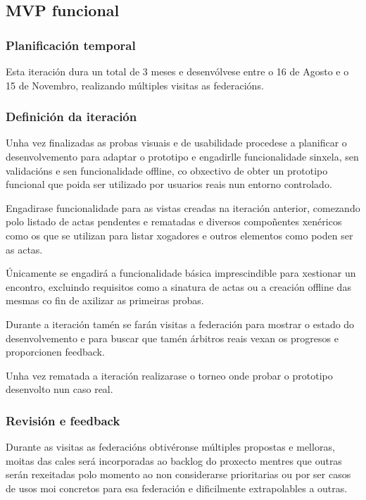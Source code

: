     \subsection{MVP funcional}

      \subsubsection{Planificación temporal}
      Esta iteración dura un total de 3 meses e desenvólvese entre o 16 de 
Agosto e o 15 de Novembro, realizando múltiples visitas as federacións.

      \subsubsection{Definición da iteración}
      Unha vez finalizadas as probas visuais e de usabilidade procedese 
a planificar o desenvolvemento para adaptar o prototipo e engadirlle 
funcionalidade sinxela, sen validacións e sen funcionalidade offline, co 
obxectivo de obter un prototipo funcional que poida ser utilizado por usuarios 
reais nun entorno controlado.

      Engadirase funcionalidade para as vistas creadas na iteración anterior, 
comezando polo listado de actas pendentes e rematadas e diversos compoñentes 
xenéricos como os que se utilizan para listar xogadores e outros elementos como 
poden ser as actas.

      Únicamente se engadirá a funcionalidade básica imprescindible para 
xestionar un encontro, excluindo requisitos como a sinatura de actas ou a 
creación offline das mesmas co fin de axilizar as primeiras probas.

      Durante a iteración tamén se farán visitas a federación para mostrar o 
estado do desenvolvemento e para buscar que tamén árbitros reais vexan os 
progresos e proporcionen feedback.

      Unha vez rematada a iteración realizarase o torneo onde probar o 
prototipo desenvolto nun caso real.

      \subsubsection{Revisión e feedback}
      Durante as visitas as federacións obtivéronse múltiples propostas e 
melloras, moitas das cales será incorporadas ao backlog do proxecto mentres que 
outras serán rexeitadas polo momento ao non considerarse prioritarias ou por 
ser casos de usos moi concretos para esa federación e dificilmente 
extrapolables a outras.

